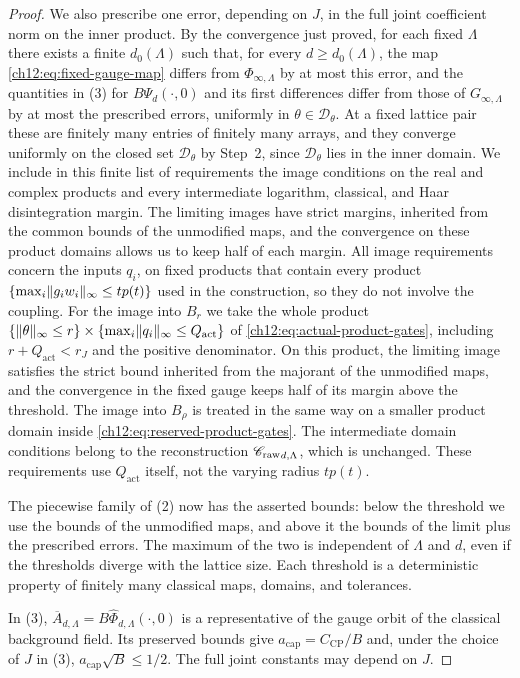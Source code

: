 \begin{proof}
We also prescribe one error, depending on $J$, in the full joint coefficient norm on the inner product. By the convergence just proved, for each fixed $\Lambda$ there exists a finite $d_0(\Lambda)$ such that, for every $d\ge d_0(\Lambda)$, the map \eqref{ch12:eq:fixed-gauge-map} differs from $\Phi_{\infty,\Lambda}$ by at most this error, and the quantities in (3) for $B\Psi_d(\cdot,0)$ and its first differences differ from those of $G_{\infty,\Lambda}$ by at most the prescribed errors, uniformly in $\theta\in\mathscr D_\theta$. At a fixed lattice pair these are finitely many entries of finitely many arrays, and they converge uniformly on the closed set $\mathscr D_\theta$ by Step~2, since $\mathscr D_\theta$ lies in the inner domain. We include in this finite list of requirements the image conditions on the real and complex products and every intermediate logarithm, classical, and Haar disintegration margin. The limiting images have strict margins, inherited from the common bounds of the unmodified maps, and the convergence on these product domains allows us to keep half of each margin. All image requirements concern the inputs $q_i$, on fixed products that contain every product $\{\max_i\lVert g_iw_i\rVert_\infty\le tp(t)\}$ used in the construction, so they do not involve the coupling. For the image into $B_r$ we take the whole product $\{\lVert \theta\rVert_\infty\le r\}\times\{\max_i\lVert q_i\rVert_\infty\le Q_{\mathrm{act}}\}$ of \eqref{ch12:eq:actual-product-gates}, including $r+Q_{\mathrm{act}}<r_J$ and the positive denominator. On this product, the limiting image satisfies the strict bound inherited from the majorant of the unmodified maps, and the convergence in the fixed gauge keeps half of its margin above the threshold. The image into $B_\rho$ is treated in the same way on a smaller product domain inside \eqref{ch12:eq:reserved-product-gates}. The intermediate domain conditions belong to the reconstruction ${\mathscr C_{\mathrm{raw}}}_{d,\Lambda}$, which is unchanged. These requirements use $Q_{\mathrm{act}}$ itself, not the varying radius $tp(t)$.

The piecewise family of (2) now has the asserted bounds: below the threshold we use the bounds of the unmodified maps, and above it the bounds of the limit plus the prescribed errors. The maximum of the two is independent of $\Lambda$ and $d$, even if the thresholds diverge with the lattice size. Each threshold is a deterministic property of finitely many classical maps, domains, and tolerances.

In (3), $\overline A_{d,\Lambda}=B\widehat\Phi_{d,\Lambda}(\cdot,0)$ is a representative of the gauge orbit of the classical background field. Its preserved bounds give $a_{\mathrm{cap}}=C_{\mathrm{CP}}/B$ and, under the choice of $J$ in (3), $a_{\mathrm{cap}}\sqrt B\le1/2$. The full joint constants may depend on $J$.


\end{proof}

